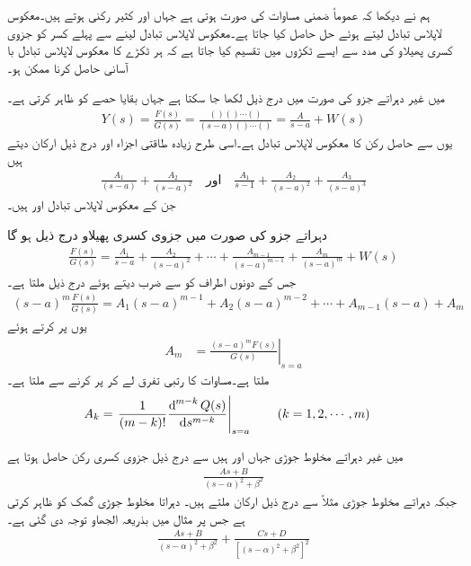 ہم نے دیکھا کہ عموماً ضمنی مساوات کی صورت  ہوتی ہے جہاں  اور  کثیر رکنی ہوتے ہیں۔معکوس لاپلاس تبادل لیتے ہوئے حل  حاصل کیا جاتا ہے۔معکوس لاپلاس تبادل لینے سے پہلے کسر کو جزوی کسری پھیلاو کی مدد سے ایسے ٹکڑوں میں تقسیم کیا جاتا ہے کہ ہر ٹکڑے کا معکوس لاپلاس تبادل با آسانی حاصل کرنا ممکن ہو۔

 میں غیر دہراتے جزو  کی صورت میں درج ذیل لکھا جا سکتا ہے جہاں  بقایا حصے کو ظاہر کرتی ہے۔
\begin{align}
Y(s)=\frac{F(s)}{G(s)}=\frac{()()\cdots()}{(s-a)()\cdots ()}=\frac{A}{s-a}+W(s)
\end{align}
یوں  سے حاصل رکن  کا معکوس لاپلاس تبادل  ہے۔اسی طرح زیادہ طاقتی اجزاء  اور  درج ذیل ارکان دیتے ہیں
\begin{align}
\frac{A_1}{(s-a)}+\frac{A_2}{(s-a)^2} \quad \text{اور} \quad \frac{A_1}{s-1}+\frac{A_2}{(s-a)^2}+\frac{A_3}{(s-a)^3}
\end{align} 
جن کے معکوس لاپلاس تبادل  اور  ہیں۔

دہراتے جزو  کی صورت میں جزوی کسری پھیلاو درج ذیل ہو گا
\begin{align}
\frac{F(s)}{G(s)}=\frac{A_1}{s-a}+\frac{A_2}{(s-a)^2}+\cdots+\frac{A_{m-1}}{(s-a)^{m-1}}+\frac{A_m}{(s-a)^m}+W(s)
\end{align}
جس کے دونوں اطراف کو  سے ضرب دیتے ہوئے درج ذیل ملتا ہے۔
\begin{align}\label{مساوات_لاپلاس_جزوی_کسری_عمومی_الف}
(s-a)^m\frac{F(s)}{G(s)}=A_1(s-a)^{m-1}+A_2(s-a)^{m-2}+\cdots+A_{m-1}(s-a)+A_m
\end{align}
یوں  پر کرتے ہوئے 
\begin{align}
A_m&=\left. \frac{(s-a)^m F(s)}{G(s)}\right|_{s=a}
\end{align}
ملتا ہے۔مساوات  کا  رتبی تفرق لے کر  پر کرنے سے  ملتا ہے۔
\begin{align}
A_k&=\left. \frac{1}{(m-k)!}\frac{\dif^{\, m-k} Q(s)}{\dif s^{m-k}}\right|_{s=a}\quad \quad (k=1,2,\cdots,m)
\end{align}

 میں غیر دہراتے مخلوط جوڑی  جہاں  اور  ہیں سے درج ذیل جزوی کسری رکن حاصل ہوتا ہے
\begin{align*}
\frac{As+B}{(s-\alpha)^2+\beta^2}
\end{align*}
جبکہ دہراتے مخلوط جوڑی مثلاً  سے درج ذیل ارکان ملتے ہیں۔ دہراتا مخلوط جوڑی گمک کو ظاہر کرتی ہے جس پر مثال  میں بذریعہ الجھاو  توجہ دی گئی ہے۔
\begin{align*}
\frac{As+B}{(s-\alpha)^2+\beta^2}+\frac{Cs+D}{[(s-\alpha)^2+\beta^2]^2}
\end{align*}

